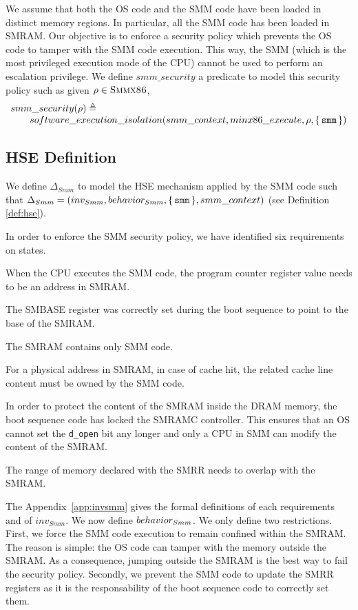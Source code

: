 We assume that both the OS code and the SMM code have been loaded in distinct
memory regions. In particular, all the SMM code has been loaded in SMRAM. Our
objective is to enforce a security policy which prevents the OS code to tamper
with the SMM code execution. This way, the SMM (which is the most privileged
execution mode of the CPU) cannot be used to perform an escalation privilege. We
define $smm\_security$ a predicate to model this security policy such as given
$\rho \in \textsc{Smmx86}$,
\[ \begin{array}{l} smm\_security(\rho) \triangleq \\ \qquad
    software\_execution\_isolation(smm\_context, minx86\_execute, \rho,
    \{\,\mathtt{smm}\,\}) \end{array} \]

\subsection{HSE Definition}

We define $\Delta_{Smm}$ to model the HSE mechanism applied by the SMM code such
that
$\Delta_{Smm} = (inv_{Smm}, behavior_{Smm}, \{\,\mathtt{smm}\,\},
smm\_context)$ (see Definition \ref{def:hse}).

In order to enforce the SMM security policy, we have identified six requirements
on states.
\begin{compactitem}
\item When the CPU executes the SMM code, the program counter register value
  needs to be an address in SMRAM.
\item The SMBASE register was correctly set during the boot sequence to point to
  the base of the SMRAM.
\item The SMRAM contains only SMM code.
\item For a physical address in SMRAM, in case of cache hit, the related cache
  line content must be owned by the SMM code.
\item In order to protect the content of the SMRAM inside the DRAM memory, the
  boot sequence code has locked the SMRAMC controller. This ensures that an OS
  cannot set the \texttt{d\_open} bit any longer and only a CPU in SMM can
  modify the content of the SMRAM.
\item The range of memory declared with the SMRR needs to overlap with the
  SMRAM.
\end{compactitem}

The Appendix~\ref{app:invsmm} gives the formal definitions of each requirements
and of $inv_{Smm}$.  We now define $behavior_{Smm}$. We only define two
restrictions. First, we force the SMM code execution to remain confined within
the SMRAM. The reason is simple: the OS code can tamper with the memory outside
the SMRAM. As a consequence, jumping outside the SMRAM is the best way to fail
the security policy. Secondly, we prevent the SMM code to update the SMRR
registers as it is the responsability of the boot sequence code to correctly set
them.

